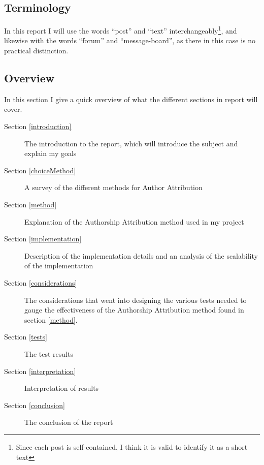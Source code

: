\subsection{Terminology}
In this report I will use the words ``post'' and ``text'' interchangeably\footnote{Since each post is self-contained, I think it is valid to identify it as a short text}, and likewise with the words ``forum'' and ``message-board'', as there in this case is no practical distinction.

\subsection{Overview}
In this section I give a quick overview of what the different sections in report will cover.
\begin{description}
\item[Section \ref{introduction}] The introduction to the report, which will introduce the subject and explain my goals
\item[Section \ref{choiceMethod}] A survey of the different methods for Author Attribution  
\item[Section \ref{method}] Explanation of the Authorship Attribution method used in my project
\item[Section \ref{implementation}] Description of the implementation details and an analysis of the scalability of the implementation
\item[Section \ref{considerations}] The considerations that went into designing the various tests needed to gauge the effectiveness of the Authorship Attribution method found in section \ref{method}.
\item[Section \ref{tests}] The test results
\item[Section \ref{interpretation}] Interpretation of results
\item[Section \ref{conclusion}] The conclusion of the report  
\end{description}
